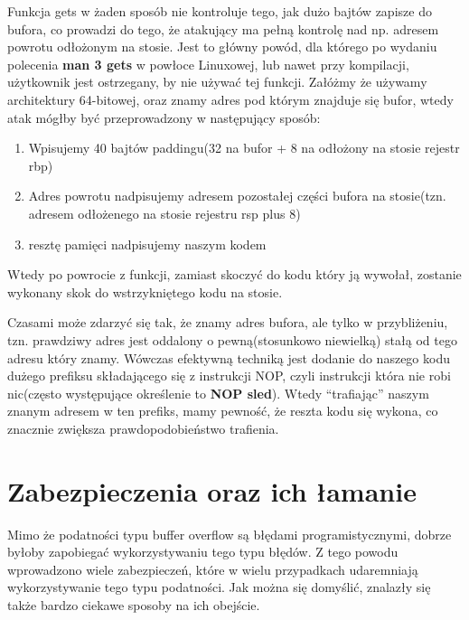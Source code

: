 \documentclass[polish]{kbk}
\begin{document}
Funkcja gets w żaden sposób nie kontroluje tego, jak dużo bajtów zapisze do bufora, 
co prowadzi do tego, że atakujący ma pełną kontrolę nad np. adresem powrotu 
odłożonym na stosie. Jest to główny powód, dla którego po wydaniu polecenia 
\textbf{man 3 gets} w powłoce Linuxowej, lub nawet przy kompilacji, użytkownik 
jest ostrzegany, by nie używać tej funkcji. Załóżmy że używamy architektury 
64-bitowej, oraz znamy adres pod którym znajduje się bufor, wtedy atak mógłby
być przeprowadzony w następujący sposób:

\begin{enumerate}
\item Wpisujemy 40 bajtów paddingu(32 na bufor + 8 na odłożony na stosie rejestr rbp)
\item Adres powrotu nadpisujemy adresem pozostałej części bufora na stosie(tzn. 
adresem odłożenego na stosie rejestru rsp plus 8)
\item resztę pamięci nadpisujemy naszym kodem
\end{enumerate}

Wtedy po powrocie z funkcji, zamiast skoczyć do kodu który ją wywołał, zostanie
wykonany skok do wstrzykniętego kodu na stosie.

\par

Czasami może zdarzyć się tak, że znamy adres bufora, ale tylko 
w przybliżeniu, tzn. prawdziwy adres jest oddalony o pewną(stosunkowo niewielką)
stałą od tego adresu który znamy. Wówczas efektywną techniką jest dodanie do 
naszego kodu dużego prefiksu składającego się z instrukcji NOP, czyli instrukcji
która nie robi nic(często występujące określenie to \textbf{NOP sled}). 
Wtedy ``trafiając'' naszym znanym adresem w ten prefiks, mamy pewność, że reszta 
kodu się wykona, co znacznie zwiększa prawdopodobieństwo trafienia. 


\section{Zabezpieczenia oraz ich łamanie}
Mimo że podatności typu buffer overflow są błędami programistycznymi, dobrze 
byłoby zapobiegać wykorzystywaniu tego typu błędów. Z tego powodu 
wprowadzono wiele zabezpieczeń, które w wielu przypadkach udaremniają 
wykorzystywanie tego typu podatności. Jak można się domyślić, znalazły 
się także bardzo ciekawe sposoby na ich obejście.
\end{document}

